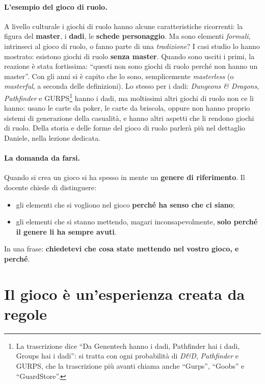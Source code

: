\paragraph{L'esempio del gioco di ruolo.} A livello culturale i giochi di ruolo
hanno alcune caratteristiche ricorrenti: la figura del \textbf{master}, i
\textbf{dadi}, le \textbf{schede personaggio}. Ma sono elementi \emph{formali},
intrinseci al gioco di ruolo, o fanno parte di una \emph{tradizione}? I casi
studio lo hanno mostrato: esistono giochi di ruolo \textbf{senza master}.
Quando sono usciti i primi, la reazione è stata fortissima: ``questi non sono
giochi di ruolo perché non hanno un master''. Con gli anni si è capito che lo
sono, semplicemente \emph{masterless} (o \emph{masterful}, a seconda delle
definizioni). Lo stesso per i dadi: \emph{Dungeons \& Dragons}, \emph{Pathfinder}
e GURPS\footnote{La trascrizione dice ``Da Genentech hanno i dadi, Pathfinder
hai i dadi, Groups hai i dadi'': si tratta con ogni probabilità di \emph{D\&D},
\emph{Pathfinder} e GURPS, che la trascrizione più avanti chiama anche ``Gurps'',
``Goobs'' e ``GuardStore''.} hanno i dadi, ma moltissimi altri giochi di ruolo
non ce li hanno: usano le carte da poker, le carte da briscola, oppure non hanno
proprio sistemi di generazione della casualità, e hanno altri aspetti che li
rendono giochi di ruolo. Della storia e delle forme del gioco di ruolo parlerà
più nel dettaglio Daniele, nella lezione dedicata.

\paragraph{La domanda da farsi.} Quando si crea un gioco si ha spesso in mente
un \textbf{genere di riferimento}. Il docente chiede di distinguere:
\begin{itemize}
  \item gli elementi che si vogliono nel gioco \textbf{perché ha senso che ci
        siano};
  \item gli elementi che si stanno mettendo, magari inconsapevolmente,
        \textbf{solo perché il genere li ha sempre avuti}.
\end{itemize}
In una frase: \textbf{chiedetevi che cosa state mettendo nel vostro gioco, e
perché}.

\section{Il gioco è un'esperienza creata da regole}
\label{a3:sec:esperienza}

